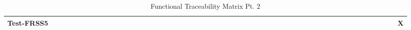 \documentclass[12pt, titlepage]{article}
\begin{document}
\begin{landscape}
\begin{table}[H]
\begin{adjustwidth}{-0.1in}{-1in}
{\begin{tabular}{c|c|c|c|c|c|c|c|c|c|c|c|c|c|c|c|c|c|c|c|c|c|c|c|c|c|c|c|c|c|c|c|c|c|c|c|c|c|c|c|c|c|c|c|c|c|c|c|c|c|c|c|}
\multicolumn{1}{|l|}{{Test-FRSS5}}  &             &              &             &              &             &             &             &             &              &              &             &             &              &             &              &            &&  &&&&&&&&&&&&&&&&&&&&&&&&&&&&&&&&&X  \\ \hline



\end{tabular}
}
\caption{Functional Traceability Matrix Pt. 2}
    \label{tab:matrix2}
\end{adjustwidth}
\end{table}

\begin{table}[H]
\centering
\begin{adjustwidth}{-0.3in}{-0.5in}
\end{adjustwidth}
\end{table}
\end{landscape}
\end{document}
